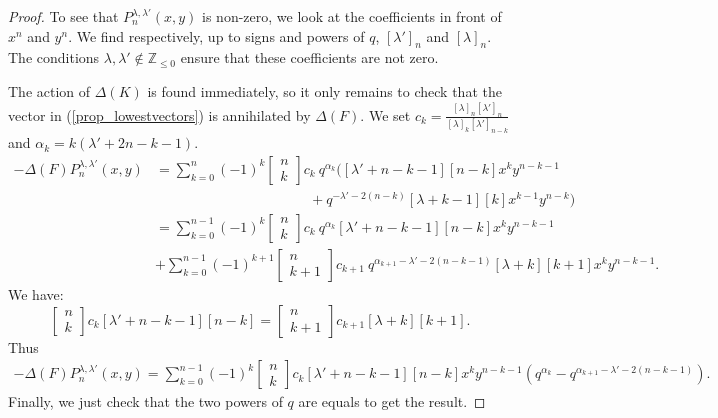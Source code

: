 \documentclass[10pt,a4paper]{amsart}
\newcommand{\Z}{\mathbb{Z}}
\newcommand{\qbinom}[2]{\begin{bmatrix}#1\\#2\end{bmatrix}}
\begin{document}
\begin{proof}
To see that $P^{\lambda,\lambda'}_n(x,y)$ is non-zero, we look at the coefficients in front of $x^n$ and $y^n$. We find respectively, up to signs and powers of $q$, $[\lambda']_n$ and $[\lambda]_n$. The conditions $\lambda,\lambda'\notin \Z_{\leq 0}$ ensure that these coefficients are not zero.

The action of $\Delta(K)$ is found immediately, so it only remains to check that the vector in (\ref{prop_lowestvectors}) is annihilated by $\Delta(F)$. We set $c_k=\frac{[\lambda]_n[\lambda']_n}{[\lambda]_k[\lambda']_{n-k}}$ and $\alpha_k=k(\lambda'+2n-k-1)$.
\begin{align*}
-\Delta(F)P_n^{\lambda,\lambda'}(x,y)&=\sum_{k=0}^n(-1)^k \qbinom{n}{k}c_k~ q^{\alpha_k}([\lambda'+n-k-1][n-k] x^ky^{n-k-1}\\
&\qquad \qquad \qquad \qquad \qquad \quad +q^{-\lambda'-2(n-k)}[\lambda+k-1][k] x^{k-1}y^{n-k} )\\
&=\sum_{k=0}^{n-1}(-1)^k \qbinom{n}{k} c_k~ q^{\alpha_k}[\lambda'+n-k-1] [n-k] x^ky^{n-k-1}\\
&+ \sum_{k=0}^{n-1}(-1)^{k+1} \qbinom{n}{k+1} c_{k+1}~ q^{\alpha_{k+1}-\lambda'-2(n-k-1)}[\lambda+k][k+1]x^ky^{n-k-1} .
\end{align*}
We have:
\begin{equation*}
\qbinom{n}{k}c_k[\lambda'+n-k-1][n-k]= \qbinom{n}{k+1}c_{k+1}[\lambda+k][k+1].
\end{equation*}
Thus
\begin{multline*}
-\Delta(F)P_n^{\lambda,\lambda'}(x,y)=
\sum_{k=0}^{n-1}(-1)^k\qbinom{n}{k}c_k[\lambda'+n-k-1][n-k] x^ky^{n-k-1} (q^{\alpha_k}-q^{\alpha_{k+1}-\lambda'-2(n-k-1)}).
\end{multline*}
Finally, we just check that the two powers of $q$ are equals to get the result. 
\end{proof}
\end{document}
